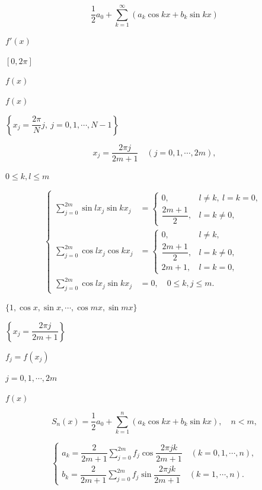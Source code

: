 \documentclass[UTF8,fontset=fandol,a4paper]{ctexart}
\begin{document}
\[
\frac12a_0+\sum_{k=1}^{\infty}(a_k\cos kx+b_k\sin kx)\tag{3.7.3}
\]

\noindent $f'(x)$\par

\noindent $[0,2\pi]$\par

\noindent $f(x)$\par

\noindent $f(x)$\par

\noindent $\left\{x_j=\dfrac{2\pi}{N}j,\ j=0,1,\cdots,N-1\right\}$\par

\[
x_j=\frac{2\pi j}{2m+1}\quad(j=0,1,\cdots,2m),
\]

\noindent $0\leqslant k,l\leqslant m$\par

\[
\left\{\begin{aligned}
\sum_{j=0}^{2m}\sin lx_j\sin kx_j&=\begin{cases}
0,&l\ne k,\ l=k=0,\\
\dfrac{2m+1}{2},&l=k\ne0,
\end{cases}\\[4pt]
\sum_{j=0}^{2m}\cos lx_j\cos kx_j&=\begin{cases}
0,&l\ne k,\\
\dfrac{2m+1}{2},&l=k\ne0,\\
2m+1,&l=k=0,
\end{cases}\\[4pt]
\sum_{j=0}^{2m}\cos lx_j\sin kx_j&=0,\quad0\leqslant k,j\leqslant m.
\end{aligned}\right.
\]

\noindent $\{1,\cos x,\sin x,\cdots,\cos mx,\sin mx\}$\par

\noindent $\left\{x_j=\dfrac{2\pi j}{2m+1}\right\}$\par

\noindent $f_j=f(x_j)$\par

\noindent $j=0,1,\cdots,2m$\par

\noindent $f(x)$\par

\[
S_n(x)=\frac12a_0+\sum_{k=1}^n(a_k\cos kx+b_k\sin kx),\quad n<m,
\]

\[
\begin{cases}
a_k=\dfrac2{2m+1}\displaystyle\sum_{j=0}^{2m}f_j\cos\dfrac{2\pi jk}{2m+1}\quad(k=0,1,\cdots,n),\\[4pt]
b_k=\dfrac2{2m+1}\displaystyle\sum_{j=0}^{2m}f_j\sin\dfrac{2\pi jk}{2m+1}\quad(k=1,\cdots,n).
\end{cases}\tag{3.7.4}
\]
\end{document}
